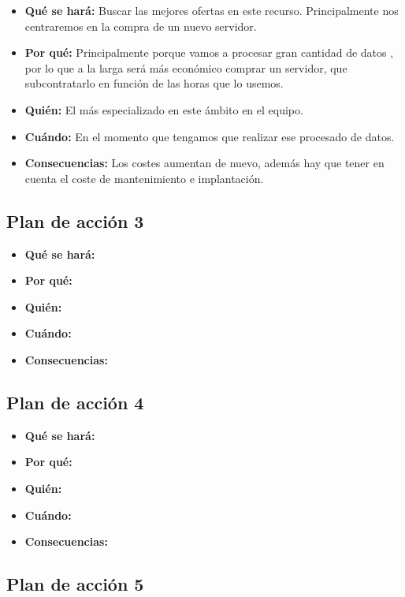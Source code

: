 \begin{itemize}
	\item \textbf{Qué se hará: } Buscar las mejores ofertas en este recurso. Principalmente nos centraremos en la compra de un nuevo servidor.
	\item \textbf{Por qué: } Principalmente porque vamos a procesar gran cantidad de datos , por lo que a la larga será más económico comprar un servidor, que subcontratarlo en función de las horas que lo usemos.
	\item \textbf{Quién: } El más especializado en este ámbito en el equipo.
	\item \textbf{Cuándo: } En el momento que tengamos que realizar ese procesado de datos.
	\item \textbf{Consecuencias: } Los costes aumentan de nuevo, además hay que tener en cuenta el coste de mantenimiento e implantación.
\end{itemize}

\subsection{Plan de acción 3}

\begin{itemize}
	\item \textbf{Qué se hará: }
	\item \textbf{Por qué: }
	\item \textbf{Quién: }
	\item \textbf{Cuándo: }
	\item \textbf{Consecuencias: }
\end{itemize}

\subsection{Plan de acción 4}

\begin{itemize}
	\item \textbf{Qué se hará: }
	\item \textbf{Por qué: }
	\item \textbf{Quién: }
	\item \textbf{Cuándo: }
	\item \textbf{Consecuencias: }
\end{itemize}

\subsection{Plan de acción 5}

